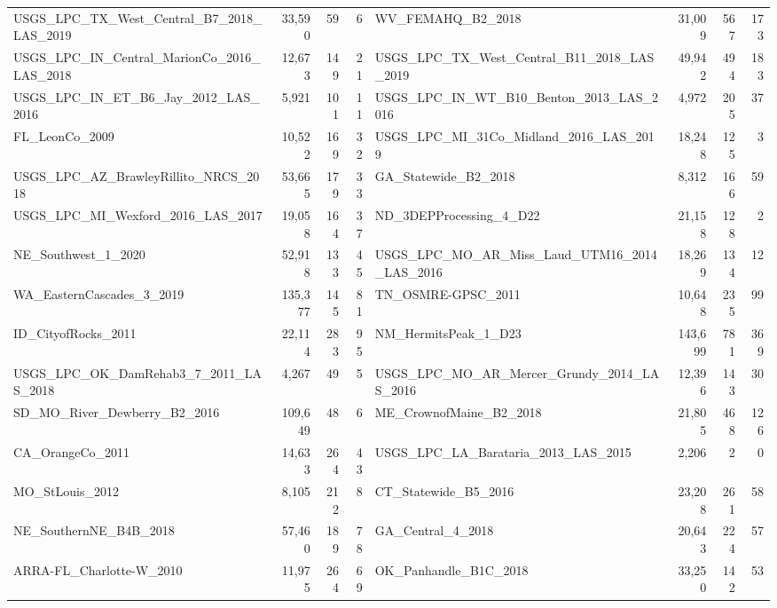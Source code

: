 \documentclass[11pt]{article}
\begin{document}
\begin{center}
{\begin{tabular}{@{}lrrr@{\hspace{8pt}}lrrr@{}}
USGS\_LPC\_TX\_West\_Central\_B7\_2018\_LAS\_2019 & 33,590 & 59 & 6 & WV\_FEMAHQ\_B2\_2018 & 31,009 & 567 & 173 \\
USGS\_LPC\_IN\_Central\_MarionCo\_2016\_LAS\_2018 & 12,673 & 149 & 21 & USGS\_LPC\_TX\_West\_Central\_B11\_2018\_LAS\_2019 & 49,942 & 494 & 183 \\
USGS\_LPC\_IN\_ET\_B6\_Jay\_2012\_LAS\_2016 & 5,921 & 101 & 11 & USGS\_LPC\_IN\_WT\_B10\_Benton\_2013\_LAS\_2016 & 4,972 & 205 & 37 \\
FL\_LeonCo\_2009 & 10,522 & 169 & 32 & USGS\_LPC\_MI\_31Co\_Midland\_2016\_LAS\_2019 & 18,248 & 125 & 3 \\
USGS\_LPC\_AZ\_BrawleyRillito\_NRCS\_2018 & 53,665 & 179 & 33 & GA\_Statewide\_B2\_2018 & 8,312 & 166 & 59 \\
USGS\_LPC\_MI\_Wexford\_2016\_LAS\_2017 & 19,058 & 164 & 37 & ND\_3DEPProcessing\_4\_D22 & 21,158 & 128 & 2 \\
NE\_Southwest\_1\_2020 & 52,918 & 133 & 45 & USGS\_LPC\_MO\_AR\_Miss\_Laud\_UTM16\_2014\_LAS\_2016 & 18,269 & 134 & 12 \\
WA\_EasternCascades\_3\_2019 & 135,377 & 145 & 81 & TN\_OSMRE-GPSC\_2011 & 10,648 & 235 & 99 \\
ID\_CityofRocks\_2011 & 22,114 & 283 & 95 & NM\_HermitsPeak\_1\_D23 & 143,699 & 781 & 369 \\
USGS\_LPC\_OK\_DamRehab3\_7\_2011\_LAS\_2018 & 4,267 & 49 & 5 & USGS\_LPC\_MO\_AR\_Mercer\_Grundy\_2014\_LAS\_2016 & 12,396 & 143 & 30 \\
SD\_MO\_River\_Dewberry\_B2\_2016 & 109,649 & 48 & 6 & ME\_CrownofMaine\_B2\_2018 & 21,805 & 468 & 126 \\
CA\_OrangeCo\_2011 & 14,633 & 264 & 43 & USGS\_LPC\_LA\_Barataria\_2013\_LAS\_2015 & 2,206 & 2 & 0 \\
MO\_StLouis\_2012 & 8,105 & 212 & 8 & CT\_Statewide\_B5\_2016 & 23,208 & 261 & 58 \\
NE\_SouthernNE\_B4B\_2018 & 57,460 & 189 & 78 & GA\_Central\_4\_2018 & 20,643 & 224 & 57 \\
ARRA-FL\_Charlotte-W\_2010 & 11,975 & 264 & 69 & OK\_Panhandle\_B1C\_2018 & 33,250 & 142 & 53 \\
\bottomrule
\end{tabular}}
\end{center}
\end{document}
